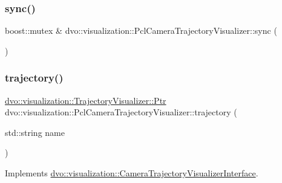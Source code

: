 \mbox{\label{classdvo_1_1visualization_1_1_pcl_camera_trajectory_visualizer_a314dca78e0ea3b86e59dc9953bfd59f0}} 
\subsubsection{\texorpdfstring{sync()}{sync()}}
{\footnotesize\ttfamily boost\+::mutex \& dvo\+::visualization\+::\+Pcl\+Camera\+Trajectory\+Visualizer\+::sync (\begin{DoxyParamCaption}{ }\end{DoxyParamCaption})}

\mbox{\label{classdvo_1_1visualization_1_1_pcl_camera_trajectory_visualizer_ad0ea0d8feefef54cd5dc15cd483b3610}} 
\subsubsection{\texorpdfstring{trajectory()}{trajectory()}}
{\footnotesize\ttfamily \mbox{\hyperlink{classdvo_1_1visualization_1_1_trajectory_visualizer_aac33ef5979fe64ee33409f1afa977fd3}{dvo\+::visualization\+::\+Trajectory\+Visualizer\+::\+Ptr}} dvo\+::visualization\+::\+Pcl\+Camera\+Trajectory\+Visualizer\+::trajectory (\begin{DoxyParamCaption}\item[{std\+::string}]{name }\end{DoxyParamCaption})\hspace{0.3cm}{\ttfamily [virtual]}}



Implements \mbox{\hyperlink{classdvo_1_1visualization_1_1_camera_trajectory_visualizer_interface_ac658e841335e51c50325267de10e64b3}{dvo\+::visualization\+::\+Camera\+Trajectory\+Visualizer\+Interface}}.

